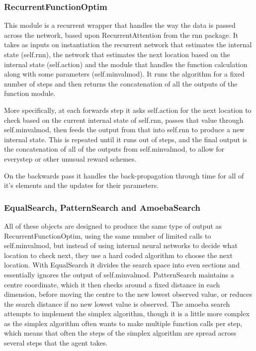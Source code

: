\subsubsection{RecurrentFunctionOptim}
This module is a recurrent wrapper that handles the way the data is passed across the network, based upon RecurrentAttention from the rnn package. It takes as inputs on instantiation the recurrent network that estimates the internal state (self.rnn), the network that estimates the next location based on the internal state (self.action) and the module that handles the function calculation along with some parameters (self.minvalmod). It runs the algorithm for a fixed number of steps and then returns the concatenation of all the outputs of the function module.

More specifically, at each forwards step it asks self.action for the next location to check based on the current internal state of self.rnn, passes that value through self.minvalmod, then feeds the output from that into self.rnn to produce a new internal state. This is repeated until it runs out of steps, and the final output is the concatenation of all of the outputs from self.minvalmod, to allow for everystep or other unusual reward schemes.

On the backwards pass it handles the back-propagation through time for all of it's elements and the updates for their parameters.

\subsubsection{EqualSearch, PatternSearch and AmoebaSearch}
All of these objects are designed to produce the same type of output as RecurrentFunctionOptim, using the same number of limited calls to self.minvalmod, but instead of using internal neural networks to decide what location to check next, they use a hard coded algorithm to choose the next location. With EqualSearch it divides the search space into even sections and essentially ignores the output of self.minvalmod. PatternSearch maintains a centre coordinate, which it then checks around a fixed distance in each dimension, before moving  the centre to the new lowest observed value, or reduces the search distance if no new lowest value is observed. The amoeba search attempts to implement the simplex algorithm, though it is a little more complex as the simplex algorithm often wants to make multiple function calls per step, which means that often the steps of the simplex algorithm are spread across several steps that the agent takes.


